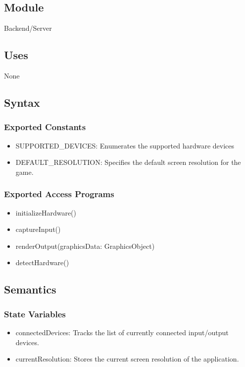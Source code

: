 \documentclass[12pt, titlepage]{article}
\begin{document}
\subsection{Module}
\hspace{1.5em}Backend/Server

\subsection{Uses}
\hspace{1.5em}None

\subsection{Syntax}

\subsubsection{Exported Constants}
\begin{itemize}
\item SUPPORTED\_DEVICES: Enumerates the supported hardware devices

\item DEFAULT\_RESOLUTION: Specifies the default screen resolution for the game.
\end{itemize}

\subsubsection{Exported Access Programs}

\begin{itemize}
\item initializeHardware()
\item captureInput()
\item renderOutput(graphicsData: GraphicsObject)
\item detectHardware()
\end{itemize}

\subsection{Semantics}

\subsubsection{State Variables}
\begin{itemize}
\item connectedDevices: Tracks the list of currently connected input/output devices.
\item currentResolution: Stores the current screen resolution of the application.
\end{itemize}
\end{document}
